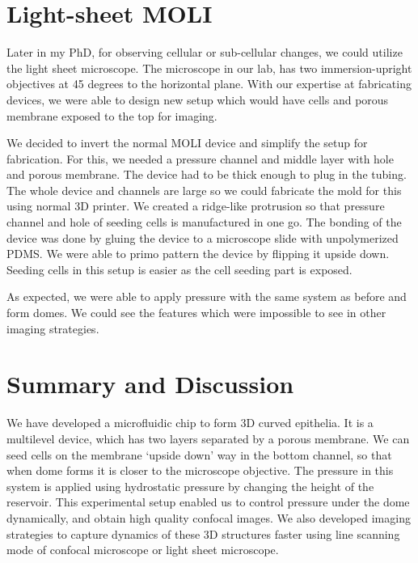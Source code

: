 \hypertarget{light-sheet-moli}{%
\section{Light-sheet MOLI}\label{light-sheet-moli}}

Later in my PhD, for observing cellular or sub-cellular changes, we
could utilize the light sheet microscope. The microscope in our lab, has
two immersion-upright objectives at 45 degrees to the horizontal plane.
With our expertise at fabricating devices, we were able to design new
setup which would have cells and porous membrane exposed to the top for
imaging.

We decided to invert the normal MOLI device and simplify the setup for
fabrication. For this, we needed a pressure channel and middle layer
with hole and porous membrane. The device had to be thick enough to plug
in the tubing. The whole device and channels are large so we could
fabricate the mold for this using normal 3D printer. We created a
ridge-like protrusion so that pressure channel and hole of seeding cells
is manufactured in one go. The bonding of the device was done by gluing
the device to a microscope slide with unpolymerized PDMS. We were able
to primo pattern the device by flipping it upside down. Seeding cells in
this setup is easier as the cell seeding part is exposed.

As expected, we were able to apply pressure with the same system as
before and form domes. We could see the features which were impossible
to see in other imaging strategies.

\hypertarget{summary-and-discussion}{%
\section{Summary and Discussion}\label{summary-and-discussion}}

We have developed a microfluidic chip to form 3D curved epithelia. It is
a multilevel device, which has two layers separated by a porous
membrane. We can seed cells on the membrane `upside down' way in the
bottom channel, so that when dome forms it is closer to the microscope
objective. The pressure in this system is applied using hydrostatic
pressure by changing the height of the reservoir. This experimental
setup enabled us to control pressure under the dome dynamically, and
obtain high quality confocal images. We also developed imaging
strategies to capture dynamics of these 3D structures faster using line
scanning mode of confocal microscope or light sheet microscope.

